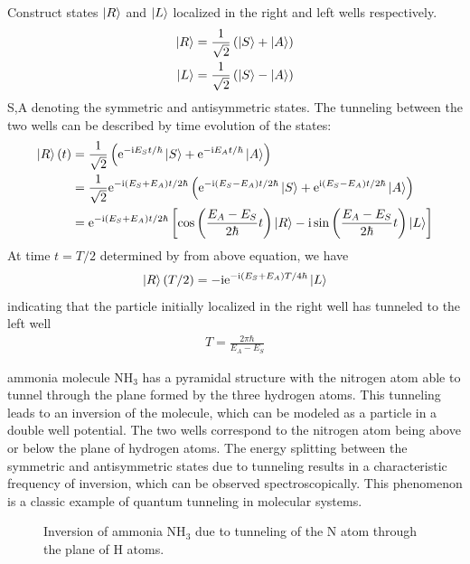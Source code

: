 Construct states $\ket R$ and $\ket L$ localized in the right and left wells respectively. 
\begin{align}
    \ket R &= \frac{1}{\sqrt 2} \left( \ket S + \ket A \right) \\
    \ket L &= \frac{1}{\sqrt 2} \left( \ket S - \ket A \right)
\end{align}
S,A denoting the symmetric and antisymmetric states. The tunneling between the two wells can be described by time evolution of the states:
\begin{align}
    \ket R(t) &= \frac{1}{\sqrt 2} \left( \mathrm{e}^{- \mathrm{i} E_S t / \hbar} \ket S + \mathrm{e}^{- \mathrm{i} E_A t / \hbar} \ket A \right) \\
    &= \frac{1}{\sqrt 2} \mathrm{e}^{- \mathrm{i} (E_S + E_A) t / 2 \hbar} \left( \mathrm{e}^{- \mathrm{i} (E_S - E_A) t / 2 \hbar} \ket S + \mathrm{e}^{\mathrm{i} (E_S - E_A) t / 2 \hbar} \ket A \right) \\
    &= \mathrm{e}^{- \mathrm{i} (E_S + E_A) t / 2 \hbar} \left[ \cos \left( \frac{E_A - E_S}{2 \hbar} t \right) \ket R - \mathrm{i} \sin \left( \frac{E_A - E_S}{2 \hbar} t \right) \ket L \right]
\end{align}
At time $t = T/2$ determined by from above equation, we have
\begin{align}
    \ket R(T/2) = - \mathrm{i} \mathrm{e}^{- \mathrm{i} (E_S + E_A) T / 4 \hbar} \ket L
\end{align}
indicating that the particle initially localized in the right well has tunneled to the left well 
\begin{align}
    T = \frac{2 \pi \hbar}{E_A - E_S}
\end{align}
\begin{ex}
    ammonia molecule NH$_3$ has a pyramidal structure with the nitrogen atom able to tunnel through the plane formed by the three hydrogen atoms. This tunneling leads to an inversion of the molecule, which can be modeled as a particle in a double well potential. The two wells correspond to the nitrogen atom being above or below the plane of hydrogen atoms. The energy splitting between the symmetric and antisymmetric states due to tunneling results in a characteristic frequency of inversion, which can be observed spectroscopically. This phenomenon is a classic example of quantum tunneling in molecular systems.
\end{ex}
\begin{figure}[h!]
    \centering
    \caption{Inversion of ammonia NH$_3$ due to tunneling of the N atom through the plane of H atoms.}
\end{figure}

